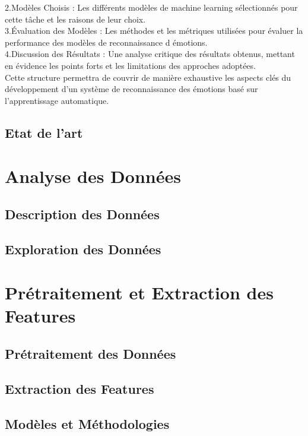 \documentclass{rapport}
\begin{document}
2.Modèles Choisis : 
Les différents modèles de machine learning sélectionnés pour cette tâche et les raisons de leur choix.\\

3.Évaluation des Modèles :
Les méthodes et les métriques utilisées pour évaluer la performance des modèles de reconnaissance d émotions.\\

4.Discussion des Résultats : 
Une analyse critique des résultats obtenus, mettant en évidence les points forts et les limitations des approches adoptées.\\

Cette structure permettra de couvrir de manière exhaustive les aspects clés du développement d'un système de reconnaissance des émotions basé sur l'apprentissage automatique.


\cite{koBriefReviewFacial2018}
\cite{sariyanidiAutomaticAnalysisFacial2015}


\subsection{Etat de l'art}

\section{Analyse des Données}
\subsection{Description des Données}
\subsection{Exploration des Données}

\section{Prétraitement et Extraction des Features}
\subsection{Prétraitement des Données}
\subsection{Extraction des Features}
\subsection{Modèles et Méthodologies}
\end{document}
